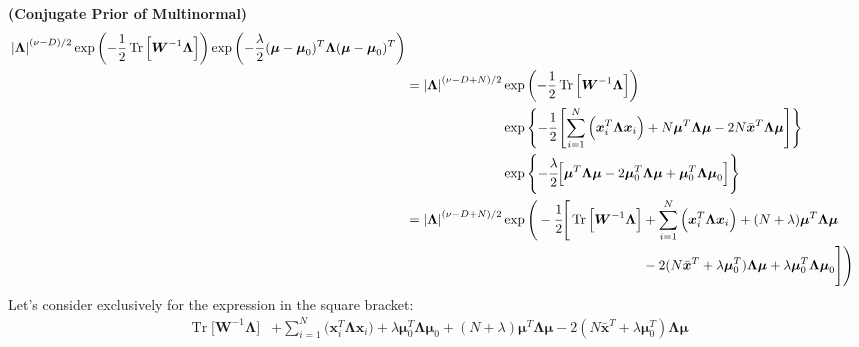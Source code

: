 \begin{remark}{\textbf{(Conjugate Prior of Multinormal)}}
\begin{equation*}
\begin{aligned}
\begin{aligned}[t]
            &\left| \boldsymbol \Lambda \right|^{(\nu-D)/2}\exp\left( -\frac{1}{2}\operatorname{Tr}\Big[\boldsymbol W^{-1}\boldsymbol \Lambda \Big] \right)  \exp\left( -\frac{\lambda}{2} (\boldsymbol \mu-\boldsymbol \mu_0)^T\boldsymbol \Lambda (\boldsymbol \mu-\boldsymbol \mu_0)^T \right) \\
        \end{aligned} \\
        &= \begin{aligned}[t]
            \left| \boldsymbol \Lambda \right|^{(\nu-D + N)/2}&\exp\left( -\frac{1}{2}\operatorname{Tr}\Big[\boldsymbol W^{-1}\boldsymbol \Lambda \Big] \right)  \\
            &\exp\left\{ -\cfrac{1}{2}\left[ \sum^N_{i=1}\Big(\boldsymbol x_i^T\boldsymbol \Lambda\boldsymbol x_i\Big) + N\boldsymbol \mu^T\boldsymbol \Lambda\boldsymbol \mu - 2N\bar{\boldsymbol x}^T\boldsymbol \Lambda\boldsymbol \mu \right] \right\} \\
            &\exp\left\{ -\cfrac{\lambda}{2}\Big[\boldsymbol \mu^T\boldsymbol \Lambda \boldsymbol \mu - 2\boldsymbol \mu_0^T\boldsymbol \Lambda\boldsymbol \mu + \boldsymbol \mu_0^T\boldsymbol \Lambda\boldsymbol \mu_0 \Big] \right\} \\
        \end{aligned}\\
        &= \begin{aligned}[t]
            \left| \boldsymbol \Lambda \right|^{(\nu-D + N)/2}\exp\Bigg(-\cfrac{1}{2}\Bigg[\operatorname{Tr}\Big[\boldsymbol W^{-1}\boldsymbol \Lambda \Big] &+ \sum^N_{i=1}\Big(\boldsymbol x_i^T\boldsymbol \Lambda\boldsymbol x_i\Big) + (N+\lambda)\boldsymbol \mu^T\boldsymbol \Lambda\boldsymbol \mu \\
            &- 2(N\bar{\boldsymbol x}^T + \lambda\boldsymbol \mu_0^T)\boldsymbol \Lambda\boldsymbol \mu+ \lambda\boldsymbol \mu_0^T\boldsymbol \Lambda\boldsymbol \mu_0\Bigg]\Bigg) \\
        \end{aligned}\\
    \end{aligned} 
    \end{equation*}
    Let's consider exclusively for the expression in the square bracket:
    \begin{equation*}
    \begin{aligned}
        \operatorname{Tr}\Big[\boldsymbol W^{-1}\boldsymbol \Lambda \Big] &+ \sum^N_{i=1}\Big(\boldsymbol x_i^T\boldsymbol \Lambda\boldsymbol x_i\Big) + \lambda\boldsymbol \mu_0^T\boldsymbol \Lambda\boldsymbol \mu_0 + (N+\lambda)\boldsymbol \mu^T\boldsymbol \Lambda\boldsymbol \mu- 2(N\bar{\boldsymbol x}^T + \lambda\boldsymbol \mu_0^T)\boldsymbol \Lambda\boldsymbol \mu  \\        

\end{aligned}
\end{equation*}
\end{remark}
